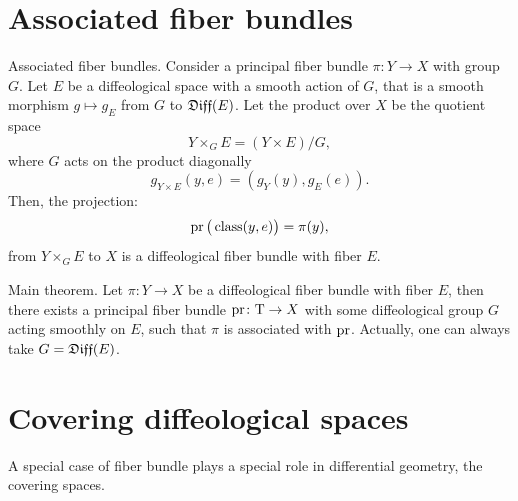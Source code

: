 \section{Associated fiber bundles}

\begin{Article}{Associated fiber bundles.}{}
  Consider a principal fiber bundle  $\pi \colon Y \to X$ with group $G$.
  Let $E$ be a diffeological space with a smooth action of $G$,
  that is a smooth morphism $g \mapsto g_E$ from $G$ to $\mathfrak{Diff}(E)$.
  Let the product over $X$ be the quotient space
  $$%
    Y \times_G E = (Y \times E)/G,
  $$%
  where $G$ acts on the product diagonally
  $$%
    g_{Y \times E}(y,e) = (g_Y(y),g_E(e)).
  $$%
  Then,
  the projection:
  $$%
    \Proj \big(\Class(y,e)\big) = \pi(y),
  $$%
  from $Y \times_G E$ to $X$ is a diffeological fiber bundle with fiber $E$.
  \begin{center}
  \end{center}
\end{Article}

\begin{Article}{Main theorem.}{}
  Let $\pi \colon Y \to X$ be a diffeological fiber bundle with fiber $E$,
  then there exists a principal fiber bundle $\operatorname{pr} \colon \mathrm{T} \to X$ with some diffeological group $G$ acting smoothly on $E$,
  such that $\pi$ is associated with $\operatorname{pr}$.
  Actually,
  one can always take $G = \mathfrak{Diff}(E)$.
\end{Article}

\section{Covering diffeological spaces}

A special case of fiber bundle plays a special role in differential geometry,
the covering spaces.

